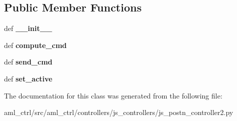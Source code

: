 \subsection*{Public Member Functions}
\begin{DoxyCompactItemize}
\item 
\hypertarget{classaml__ctrl_1_1controllers_1_1js__controllers_1_1js__postn__controller2_1_1_j_s_position_controller2_aa8a61d18bf5afb1b5b3f2e78a206cf8d}{def {\bfseries \-\_\-\-\_\-init\-\_\-\-\_\-}}\label{classaml__ctrl_1_1controllers_1_1js__controllers_1_1js__postn__controller2_1_1_j_s_position_controller2_aa8a61d18bf5afb1b5b3f2e78a206cf8d}

\item 
\hypertarget{classaml__ctrl_1_1controllers_1_1js__controllers_1_1js__postn__controller2_1_1_j_s_position_controller2_a61710e90a47f74eba5ac6420726621c9}{def {\bfseries compute\-\_\-cmd}}\label{classaml__ctrl_1_1controllers_1_1js__controllers_1_1js__postn__controller2_1_1_j_s_position_controller2_a61710e90a47f74eba5ac6420726621c9}

\item 
\hypertarget{classaml__ctrl_1_1controllers_1_1js__controllers_1_1js__postn__controller2_1_1_j_s_position_controller2_a58bfbf5a7565dcafbb09fdd38731ab7f}{def {\bfseries send\-\_\-cmd}}\label{classaml__ctrl_1_1controllers_1_1js__controllers_1_1js__postn__controller2_1_1_j_s_position_controller2_a58bfbf5a7565dcafbb09fdd38731ab7f}

\item 
\hypertarget{classaml__ctrl_1_1controllers_1_1js__controllers_1_1js__postn__controller2_1_1_j_s_position_controller2_ab6104191cd94f2cbf5ed1a4c4cdf5957}{def {\bfseries set\-\_\-active}}\label{classaml__ctrl_1_1controllers_1_1js__controllers_1_1js__postn__controller2_1_1_j_s_position_controller2_ab6104191cd94f2cbf5ed1a4c4cdf5957}

\end{DoxyCompactItemize}


The documentation for this class was generated from the following file\-:\begin{DoxyCompactItemize}
\item 
aml\-\_\-ctrl/src/aml\-\_\-ctrl/controllers/js\-\_\-controllers/js\-\_\-postn\-\_\-controller2.\-py\end{DoxyCompactItemize}
